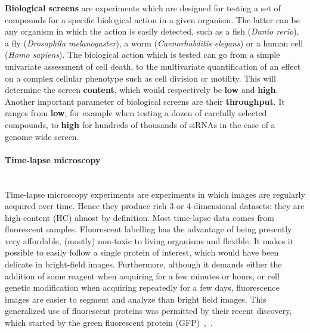 \textbf{Biological screens} are experiments which are designed for testing a set of compounds for a specific biological action in a given organism. The latter can be any organism in which the action is easily detected, such as a fish (\textit{Danio rerio}), a fly (\textit{Drosophila melanogaster}), a worm (\textit{Caenorhabditis elegans}) or a human cell (\textit{Homo sapiens}). The biological action which is tested can go from a simple univariate assessment of cell death, to the multivariate quantification of an effect on a complex cellular phenotype such as cell division or motility. This will determine the screen \textbf{content}, which would respectively be \textbf{low} and \textbf{high}. Another important parameter of biological screens are their \textbf{throughput}. It ranges from \textbf{low}, for example when testing a dozen of carefully selected compounds, to \textbf{high} for hundreds of thousands of siRNAs in the case of a genome-wide screen. 

\paragraph*{Time-lapse microscopy}~\\
Time-lapse microscopy experiments are experiments in which images are regularly acquired over time. Hence they produce rich 3 or 4-dimensional datasets: they are high-content (HC) almost by definition. Most time-lapse data comes from fluorescent samples. Fluorescent labelling has the advantage of being presently very affordable, (mostly) non-toxic to living organisms and flexible. It makes it possible to easily follow a single protein of interest, which would have been delicate in bright-field images. Furthermore, although it demands either the addition of some reagent when acquiring for a few minutes or hours, or cell genetic modification when acquiring repeatedly for a few days, fluorescence images are easier to segment and analyze than bright field images. This generalized use of fluorescent proteins was permitted by their recent discovery, which started by the green fluorescent protein (GFP)~\cite{pmid8303295},~\cite{pmid19575655}.


